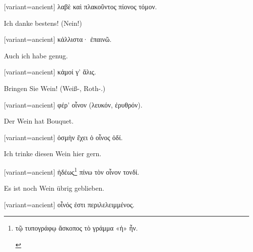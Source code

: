 \begin{greek}[variant=ancient]%
λαβὲ καὶ πλακοῦντος πίονος τόμον.

\end{greek}%
\switchcolumn*

Ich danke bestens! (Nein!)

\switchcolumn

\begin{greek}[variant=ancient]%
κάλλιστα· ἐπαινῶ.

\end{greek}%
\switchcolumn*

Auch ich habe genug.

\switchcolumn

\begin{greek}[variant=ancient]%
κἀμοί γ' ἅλις.

\end{greek}%
\switchcolumn*

Bringen Sie Wein! (Weiß-, Roth-.)

\switchcolumn

\begin{greek}[variant=ancient]%
φέρ' οἶνον (λευκόν, ἐρυθρόν).

\end{greek}%
\switchcolumn*

Der Wein hat Bouquet.

\switchcolumn

\begin{greek}[variant=ancient]%
ὀσμὴν ἔχει ὁ οἶνος ὁδί.

\end{greek}%
\switchcolumn*

Ich trinke diesen Wein hier gern.

\switchcolumn

\begin{greek}[variant=ancient]%
ἡδέως\footnote{\begin{latin}%
\textgreek[variant=ancient]{τῷ τυπογράφῳ ἄσκοπος τὸ γράμμα «ἡ» ἦν.}\end{latin}%
} πίνω τὸν οἶνον τονδί.

\end{greek}%
\switchcolumn*

Es ist noch Wein übrig geblieben.

\switchcolumn

\begin{greek}[variant=ancient]%
οἶνός ἐστι περιλελειμμένος.

\end{greek}%
\switchcolumn*

